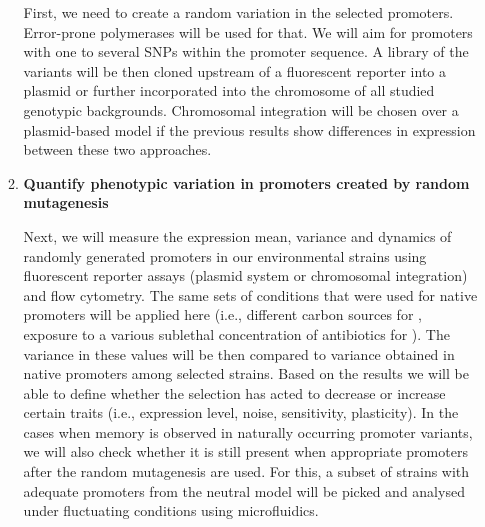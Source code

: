 \begin{enumerate}[font=\bfseries]
\begin{enumerate}[font=\bfseries]
        First, we need to create a random variation in the selected promoters.
        Error-prone polymerases will be used for that.
        We will aim for promoters with one to several SNPs within the promoter sequence.
        A library of the variants will be then cloned upstream of a fluorescent reporter into a plasmid or further incorporated into the chromosome of all studied genotypic backgrounds.
        Chromosomal integration will be chosen over a plasmid-based model if the previous results show differences in expression between these two approaches.

        \item \textbf{Quantify phenotypic variation in promoters created by random mutagenesis}
        
        Next, we will measure the expression mean, variance and dynamics of randomly generated promoters in our environmental strains using fluorescent reporter assays (plasmid system or chromosomal integration) and flow cytometry.
        The same sets of conditions that were used for native promoters will be applied here (i.e., different carbon sources for , exposure to a various sublethal concentration of antibiotics for ).
        The variance in these values will be then compared to variance obtained in native promoters among selected strains.
        Based on the results we will be able to define whether the selection has acted to decrease or increase certain traits (i.e., expression level, noise, sensitivity, plasticity).
        In the cases when memory is observed in naturally occurring promoter variants, we will also check whether it is still present when appropriate promoters after the random mutagenesis are used.
        For this, a subset of strains with adequate promoters from the neutral model will be picked and analysed under fluctuating conditions using microfluidics.
    
    \end{enumerate}

\end{enumerate}

\cleardoublepage%

\shorthandon{-} 
